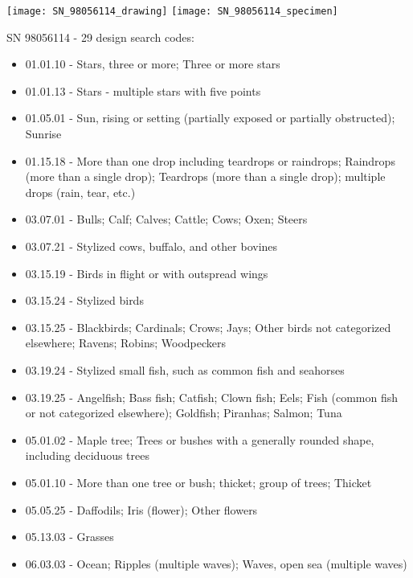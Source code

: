 \documentclass[aspectratio = 1610]{beamer}
\begin{document}
\begin{frame}

\begin{minipage}{.5\textwidth}
\texttt{[image: SN\_98056114\_drawing]}
\texttt{[image: SN\_98056114\_specimen]}
\end{minipage}%
\begin{minipage}{.5\textwidth}

\tiny

SN 98056114 - 29 design search codes:\par\medskip

\begin{itemize}

\TINY

\item 01.01.10 - Stars, three or more; Three or more stars
\item 01.01.13 - Stars - multiple stars with five points
\item 01.05.01 - Sun, rising or setting (partially exposed or partially obstructed); Sunrise
\item 01.15.18 - More than one drop including teardrops or raindrops; Raindrops (more than a single drop); Teardrops (more than a single drop); multiple drops (rain, tear, etc.)
\item 03.07.01 - Bulls; Calf; Calves; Cattle; Cows; Oxen; Steers
\item 03.07.21 - Stylized cows, buffalo, and other bovines
\item 03.15.19 - Birds in flight or with outspread wings
\item 03.15.24 - Stylized birds
\item 03.15.25 - Blackbirds; Cardinals; Crows; Jays; Other birds not categorized elsewhere; Ravens; Robins; Woodpeckers
\item 03.19.24 - Stylized small fish, such as common fish and seahorses
\item 03.19.25 - Angelfish; Bass fish; Catfish; Clown fish; Eels; Fish (common fish or not categorized elsewhere); Goldfish; Piranhas; Salmon; Tuna
\item 05.01.02 - Maple tree; Trees or bushes with a generally rounded shape, including deciduous trees
\item 05.01.10 - More than one tree or bush; thicket; group of trees; Thicket
\item 05.05.25 - Daffodils; Iris (flower); Other flowers
\item 05.13.03 - Grasses
\item 06.03.03 - Ocean; Ripples (multiple waves); Waves, open sea (multiple waves)

\end{itemize}
\end{minipage}
\end{frame}
\end{document}
